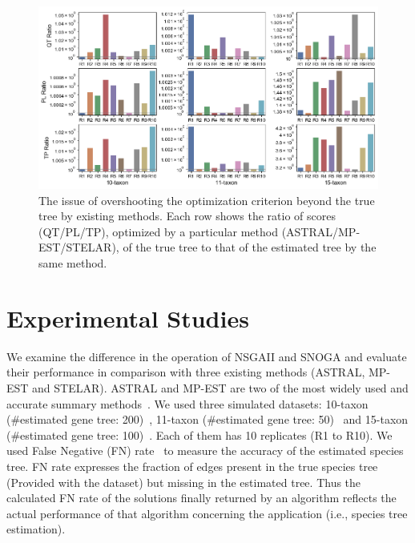 \begin{figure}[!htbp]
	\begin{adjustwidth}{-4cm}{-3cm}
		\centering    
		\includegraphics[width=1\textwidth]{Figure/tool_ratio}
	\end{adjustwidth}
	\caption{The issue of overshooting the optimization criterion beyond the true tree by existing methods. Each row shows the ratio of scores (QT/PL/TP), optimized by a particular method (ASTRAL/MP-EST/STELAR), of the true tree to that of the estimated tree by the same method.} \label{fig:tool_ratio}
\end{figure}

\section{Experimental Studies}
\label{sec:experiment}
We examine the difference in the operation of NSGAII and SNOGA and evaluate their performance in comparison with three existing methods (ASTRAL, MP-EST and STELAR). ASTRAL and MP-EST are two of the most widely used and accurate summary methods~\cite{islam2019stelar}. We used three simulated datasets: 10-taxon (\#estimated gene tree: 200)~\cite{bayzid2015weighted}, 11-taxon (\#estimated gene tree: 50)~\cite{chung2011comparing} and 15-taxon (\#estimated gene tree: 100)~\cite{statistical-binning}. Each of them has 10 replicates (R1 to R10). We used False Negative (FN) rate~\cite{bayzid2013naive} to measure the accuracy of the estimated species tree. FN rate expresses the fraction of edges present in the true species tree (Provided with the dataset) but missing in the estimated tree. Thus the calculated FN rate of the solutions finally returned by an algorithm reflects the actual performance of that algorithm concerning the application (i.e., species tree estimation).%

